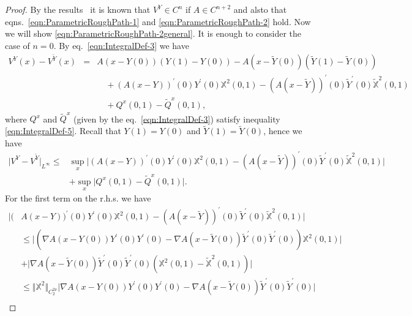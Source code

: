 \documentclass[11pt,a4paper,reqno]{amsart}%
\theoremstyle{plain}
\theoremstyle{remark}
\theoremstyle{plain}
\numberwithin{equation}{section}
\def\supl{\sup\limits}
\def\supl{\mathop{\sup}\limits}
\begin{document}
\begin{proof}%
By the results~\cite[Lemma $7$]{[Bess+Gub_2005]} it is known that $V^Y \in C^{n}$ if $A\in C^{n+2}$ and alsto that eqns.~\eqref{eqn:ParametricRoughPath-1} and
\eqref{eqn:ParametricRoughPath-2} hold. Now we will show
\eqref{eqn:ParametricRoughPath-2general}. It is enough to consider
the case of $n=0$. By eq.~\eqref{eqn:IntegralDef-3}  we have
\begin{eqnarray}
V^Y(x)-V^{\tilde{Y}}(x)&=&A(x-Y(0))(Y(1)-Y(0))
-A(x-\tilde{Y}(0))(\tilde{Y}(1)-\tilde{Y}(0))\nonumber\\
&&\quad + (A(x-Y))^\prime(0)Y^\prime(0)\mathbb{X}^2(0,1)
-(A(x-\tilde{Y}))^\prime(0)\tilde{Y}^\prime(0)\mathbb{\tilde{X}}^2(0,1)
\nonumber\\
&&\quad + Q^x(0,1)-\tilde{Q}^x(0,1),
\nonumber
\end{eqnarray}
where $Q^x$ and $\tilde{Q}^x$ (given by the eq.~\eqref{eqn:IntegralDef-3}) satisfy
inequality \eqref{eqn:IntegralDef-5}. Recall that $Y(1)=Y(0)$ and $\tilde{Y}(1)=\tilde{Y}(0)$, hence we have
\begin{equation}\label{eqn:PRaux-1}
\begin{split}
\vert V^Y-V^{\tilde{Y}}\vert_{L^{\infty}}\leq &
\supl_x\vert (A(x-Y))^\prime(0)Y^\prime(0)\mathbb{X}^2(0,1)-
(A(x-\tilde{Y}))^\prime(0)\tilde{Y}^\prime(0)\mathbb{\tilde{X}}^2(0,1)\vert \\
& +\supl_x\vert Q^x(0,1)-\tilde{Q}^x(0,1)\vert .
\end{split}
\end{equation}
For the first term on the r.h.s. we have
\begin{equation}
\label{eqn:PRaux-2}
\begin{split}
\vert (&A(x-Y))^\prime(0)Y^\prime(0)\mathbb{X}^2(0,1)-
(A(x-\tilde{Y}))^\prime(0)\tilde{Y}^\prime(0)\mathbb{\tilde{X}}^2(0,1)\vert \\
&\leq
\vert (\nabla A(x-Y(0))Y^\prime(0)Y^\prime(0)-\nabla A(x-\tilde{Y}(0))\tilde{Y}^\prime(0)\tilde{Y}^\prime(0))\mathbb{X}^2(0,1)\vert \\
&+\vert \nabla A(x-\tilde{Y}(0))\tilde{Y}^\prime(0)\tilde{Y}^\prime(0)(\mathbb{X}^2(0,1)-\mathbb{\tilde{X}}^2(0,1))\vert \\
&\leq \Vert \mathbb{X}^2\Vert_{C_2^{2\nu}}\vert \nabla A(x-Y(0))Y^\prime(0)Y^\prime(0)-\nabla A(x-\tilde{Y}(0))\tilde{Y}^\prime(0)\tilde{Y}^\prime(0)\vert \\

\end{split}
\end{equation}
\end{proof}
\end{document}
